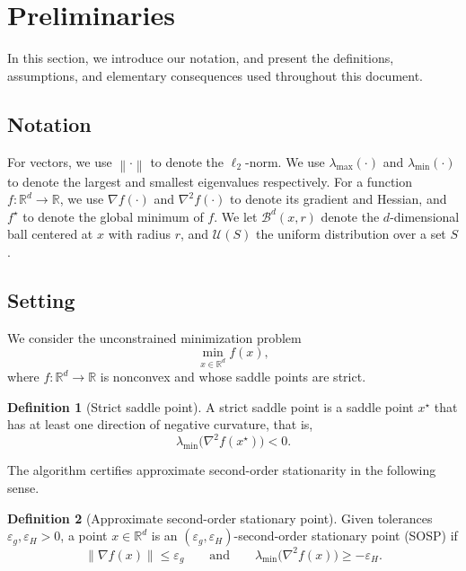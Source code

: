 \documentclass[11pt,a4paper]{article}
\theoremstyle{plain}
\theoremstyle{definition}
\newtheorem{definition}{Definition}
\newcommand{\R}{\mathbb{R}}
\newcommand{\norm}[1]{\left\|#1\right\|}
\newcommand{\eps}{\varepsilon}
\newcommand{\epsg}{\eps_{g}}
\newcommand{\epsH}{\eps_{H}}
\newcommand{\grad}{\nabla}
\newcommand{\hess}{\nabla^{2}}
\newcommand{\xstar}{x^{\star}}
\newcommand{\fstar}{f^{\star}}
\begin{document}
\section{Preliminaries}\label{sec:prelim}
In this section, we introduce our notation, and present the definitions, assumptions,
and elementary consequences used throughout this document.

\subsection{Notation}
For vectors, we use
$\norm{\cdot}$ to denote the $\ell_2$-norm. We use $\lambda_{\max}(\cdot)$ and
$\lambda_{\min}(\cdot)$ to denote the largest and smallest eigenvalues respectively.
For a function $f \colon \R^{d} \to \R$, we use $\grad f(\cdot)$ and $\hess f(\cdot)$ to
denote its gradient and Hessian, and $\fstar$ to denote the global minimum of $f$. We
let $\mathcal{B}^{d}(x, r)$ denote the $d$-dimensional ball centered at $x$ with radius
$r$, and $\mathcal{U}(S)$ the uniform distribution over a set $S$.

\subsection{Setting}
We consider the unconstrained minimization problem
\begin{equation}\label{eq:problem}
\min_{x \in \R^{d}} f(x),
\end{equation}
where $f \colon \R^{d} \to \R$ is nonconvex and whose saddle points are strict.

\begin{definition}[Strict saddle point]\label{def:strictsaddle}
A strict saddle point is a saddle point $\xstar$ that has at least one direction of
negative curvature, that is,
\begin{equation}
\lambda_{\min}\!\big(\hess f(\xstar)\big) < 0 .
\end{equation}
\end{definition}

\noindent The algorithm certifies approximate second-order stationarity in the following sense.

\begin{definition}[Approximate second-order stationary point]\label{def:2osp}
Given tolerances $\epsg, \epsH > 0$, a point $x \in \R^{d}$ is an
$(\epsg, \epsH)$-second-order stationary point (SOSP) if
\begin{equation}\label{eq:2osp}
\norm{\grad f(x)} \leq \epsg
\qquad\text{and}\qquad
\lambda_{\min}\!\big(\hess f(x)\big) \geq -\epsH .
\end{equation}
\end{definition}
\end{document}
